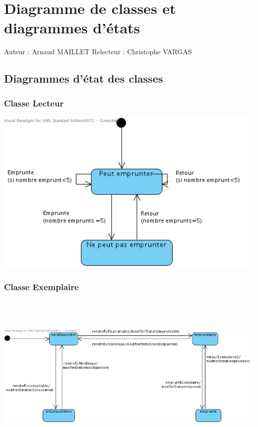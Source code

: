 \documentclass[a4paper,10pt]{report}
\begin{document}
\newpage

\chapter*{Diagramme de classes et diagrammes d'états}

Auteur : Arnaud MAILLET
Relecteur : Christophe VARGAS

\bigskip

\section*{Diagrammes d'état des classes}

\subsection*{Classe Lecteur}
\bigskip
\includegraphics[height=80mm]{ETLecteur.png}

\subsection*{Classe Exemplaire}
\bigskip
\includegraphics[height=80mm]{ETExemplaire.png}
\newpage
\end{document}
